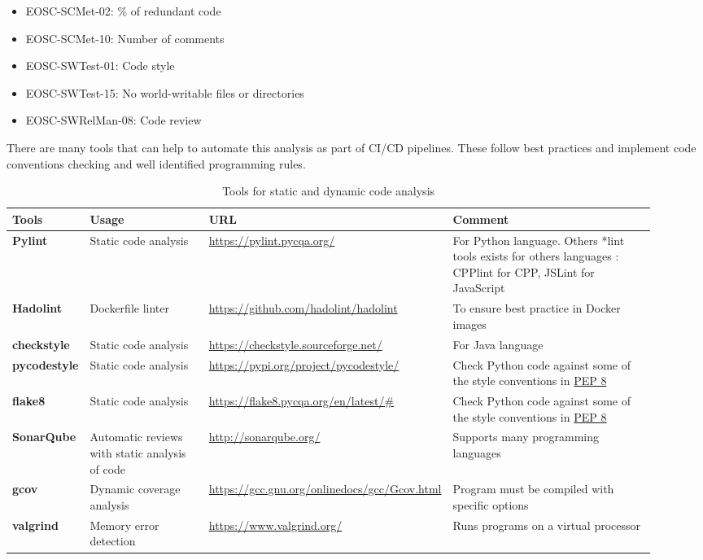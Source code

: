 \begin{itemize}
  \item EOSC-SCMet-02: \% of redundant code
  \item EOSC-SCMet-10: Number of comments
  \item EOSC-SWTest-01: Code style
  \item EOSC-SWTest-15: No world-writable files or directories
  \item EOSC-SWRelMan-08: Code review
\end{itemize}

There are many tools that can help to automate this analysis as part of CI/CD pipelines. These follow best practices and implement code conventions checking and well identified programming rules.

\begin{center}
\begin{table}[h]

  \small
  \begin{tabular}{|p{0.12\linewidth}|p{0.2\linewidth}|p{0.25\linewidth}|p{0.35\linewidth}|} \hline

    \textbf{Tools} & \textbf{Usage} & \textbf{URL} & \textbf{Comment} \\ \hline \hline
    \textbf{Pylint} & Static code analysis & \url{https://pylint.pycqa.org/} & For Python language. Others *lint tools exists for others languages : CPPlint for CPP, JSLint for JavaScript \\ \hline
    \textbf{Hadolint} & Dockerfile linter & \url{https://github.com/hadolint/hadolint} & To ensure best practice in Docker images \\ \hline
    \textbf{checkstyle} & Static code analysis & \url{https://checkstyle.sourceforge.net/} & For Java language  \\ \hline
    \textbf{pycodestyle} & Static code analysis & \url{https://pypi.org/project/pycodestyle/} & Check Python code against some of the style conventions in \href{http://www.python.org/dev/peps/pep-0008/}{PEP 8}  \\ \hline
    \textbf{flake8} & Static code analysis & \url{https://flake8.pycqa.org/en/latest/#} & Check Python code against some of the style conventions in \href{http://www.python.org/dev/peps/pep-0008/}{PEP 8} \\ \hline
    \textbf{SonarQube} & Automatic reviews with static analysis of code & \url{http://sonarqube.org/} & Supports many programming languages  \\ \hline
    \textbf{gcov} & Dynamic coverage analysis & \url{https://gcc.gnu.org/onlinedocs/gcc/Gcov.html} & Program must be compiled with specific options  \\ \hline
    \textbf{valgrind} & Memory error detection & \url{https://www.valgrind.org/} & Runs programs on a virtual processor  \\ \hline

  \end{tabular}
  \caption{Tools for static and dynamic code analysis}
  \label{tab:tools_pack03}
\end{table}
\end{center}

